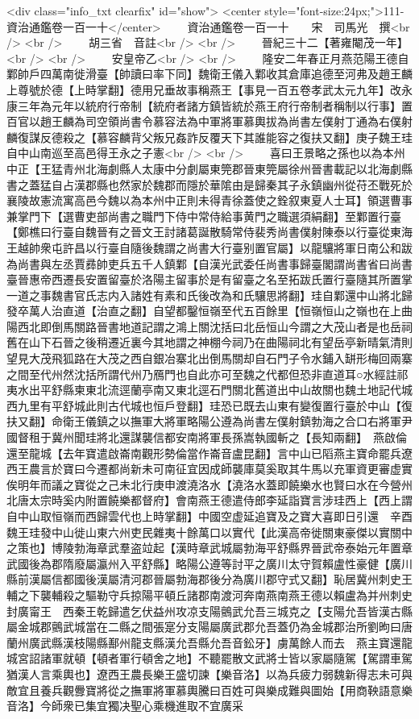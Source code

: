 <div class="info_txt clearfix" id="show">
<center style="font-size:24px;">111-資治通鑑卷一百一十</center>
  　　資治通鑑卷一百一十　　宋　司馬光　撰<br />
<br />
　　胡三省　音註<br />
<br />
　　晉紀三十二【著雍閹茂一年】<br />
<br />
　　安皇帝乙<br />
<br />
　　隆安二年春正月燕范陽王德自鄴帥戶四萬南徙滑臺【帥讀曰率下同】魏衛王儀入鄴收其倉庫追德至河弗及趙王麟上尊號於德【上時掌翻】德用兄垂故事稱燕王【事見一百五卷孝武太元九年】改永康三年為元年以統府行帝制【統府者諸方鎮皆統於燕王府行帝制者稱制以行事】置百官以趙王麟為司空領尚書令慕容法為中軍將軍慕輿拔為尚書左僕射丁通為右僕射麟復謀反德殺之【慕容麟背父叛兄姦詐反覆天下其誰能容之復扶又翻】庚子魏王珪自中山南巡至高邑得王永之子憲<br />
<br />
　　喜曰王景略之孫也以為本州中正【王猛青州北海劇縣人太康中分劇屬東筦郡晉東筦屬徐州晉書載記以北海劇縣書之蓋猛自占漢郡縣也然家於魏郡而隱於華隂由是歸秦其子永鎮幽州從苻丕戰死於襄陵故憲流寓高邑今魏以為本州中正則未得青徐蓋使之銓叙東夏人士耳】領選曹事兼掌門下【選曹吏部尚書之職門下侍中常侍給事黄門之職選須絹翻】至鄴置行臺【鄭樵曰行臺自魏晉有之晉文王討諸葛誕散騎常侍裴秀尚書僕射陳泰以行臺從東海王越帥衆屯許昌以行臺自隨後魏謂之尚書大行臺别置官屬】以龍驤將軍日南公和跋為尚書與左丞賈彞帥吏兵五千人鎮鄴【自漢光武委任尚書事歸臺閣謂尚書省曰尚書臺晉惠帝西遷長安置留臺於洛陽主留事於是有留臺之名至拓跋氏置行臺隨其所置掌一道之事魏書官氏志内入諸姓有素和氏後改為和氏驤思將翻】珪自鄴還中山將北歸發卒萬人治直道【治直之翻】自望都鑿恒嶺至代五百餘里【恒嶺恒山之嶺也在上曲陽西北即倒馬關路晉書地道記謂之鴻上關沈括曰北岳恒山今謂之大茂山者是也岳祠舊在山下石晉之後稍遷近裏今其地謂之神棚今祠乃在曲陽祠北有望岳亭新晴氣清則望見大茂飛狐路在大茂之西自銀冶寨北出倒馬關却自石門子令水鋪入缾形梅回兩寨之間至代州然沈括所謂代州乃鴈門也自此亦可至魏之代都但恐非直道耳○水經註祁夷水出平舒縣柬東北流逕蘭亭南又東北逕石門關北舊道出中山故關也魏土地記代城西九里有平舒城此則古代城也恒戶登翻】珪恐已既去山東有變復置行臺於中山【復扶又翻】命衛王儀鎮之以撫軍大將軍略陽公遵為尚書左僕射鎮勃海之合口右將軍尹國督租于冀州聞珪將北還謀襲信都安南將軍長孫嵩執國斬之【長知兩翻】　燕啟倫還至龍城【去年寶遣啟崙南觀形勢倫當作崙音盧昆翻】言中山已䧟燕主寶命罷兵遼西王農言於寶曰今遷都尚新未可南征宜因成師襲庫莫奚取其牛馬以充軍資更審虚實俟明年而議之寶從之己未北行庚申渡澆洛水【澆洛水蓋即饒樂水也賢曰水在今營州北唐太宗時奚内附置饒樂都督府】會南燕王德遣侍郎李延詣寶言涉珪西上【西上謂自中山取恒嶺而西歸雲代也上時掌翻】中國空虚延追寶及之寶大喜即日引還　辛酉魏王珪發中山徙山東六州吏民雜夷十餘萬口以實代【此漢高帝徙關東豪傑以實關中之策也】博陵勃海章武羣盗竝起【漢時章武城屬勃海平舒縣界晉武帝泰始元年置章武國後為郡隋廢屬瀛州入平舒縣】略陽公遵等討平之廣川太守賀賴盧性豪健【廣川縣前漢屬信都國後漢屬清河郡晉屬勃海郡後分為廣川郡守式又翻】恥居冀州刺史王輔之下襲輔殺之驅勒守兵掠陽平頓丘諸郡南渡河奔南燕南燕王德以賴盧為并州刺史封廣甯王　西秦王乾歸遣乞伏益州攻凉支陽鸇武允吾三城克之【支陽允吾皆漢古縣屬金城郡鸇武城當在二縣之間張寔分支陽屬廣武郡允吾蓋仍為金城郡治所劉昫曰唐蘭州廣武縣漢枝陽縣鄯州龍支縣漢允吾縣允吾音鈆牙】虜萬餘人而去　燕主寶還龍城宮詔諸軍就頓【頓者軍行頓舍之地】不聽罷散文武將士皆以家屬隨駕【駕謂車駕猶漢人言乘輿也】遼西王農長樂王盛切諫【樂音洛】以為兵疲力弱魏新得志未可與敵宜且養兵觀釁寶將從之撫軍將軍慕輿騰曰百姓可與樂成難與圖始【用商鞅語意樂音洛】今師衆已集宜獨决聖心乘機進取不宜廣采
